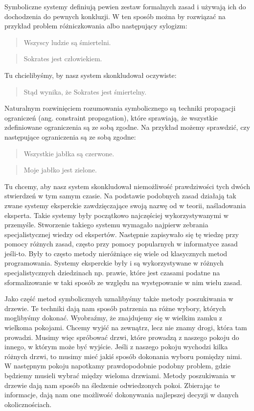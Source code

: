 \noindent Symboliczne systemy definiują pewien zestaw formalnych zasad i używają ich do dochodzenia do pewnych konkluzji. W ten sposób można by rozwiązać na przykład problem różniczkowania albo następujący sylogizm:

\begin{quote}
Wszyscy ludzie są śmiertelni.
\end{quote}
\begin{quote}
Sokrates jest człowiekiem.
\end{quote}

\noindent Tu chcielibyśmy, by nasz system skonkludował oczywiste:

\begin{quote}
Stąd wynika, że Sokrates jest śmiertelny.
\end{quote}

\noindent Naturalnym rozwinięciem rozumowania symbolicznego są techniki propagacji ograniczeń (ang. constraint propagation), które sprawiają, że wszystkie zdefiniowane ograniczenia są ze sobą zgodne. Na przykład możemy sprawdzić, czy następujące ograniczenia są ze sobą zgodne:

\begin{quote}
Wszystkie jabłka są czerwone.
\end{quote}
\begin{quote}
Moje jabłko jest zielone.
\end{quote}

Tu chcemy, aby nasz system skonkludował niemożliwość prawdziwości tych dwóch stwierdzeń w tym samym czasie. Na podstawie podobnych zasad działają tak zwane systemy eksperckie zawdzięczające swoją nazwę od w teorii, naśladowania eksperta. Takie systemy były początkowo najczęściej wykorzystywanymi w przemyśle. Stworzenie takiego systemu wymagało najpierw zebrania specjalistycznej wiedzy od ekspertów. Następnie zapisywało się tę wiedzę przy pomocy różnych zasad, często przy pomocy popularnych w informatyce zasad jeśli-to. Były to często metody nieróżniące się wiele od klasycznych metod programowania. Systemy eksperckie były i są wykorzystywane w różnych specjalistycznych dziedzinach np. prawie, które jest czasami podatne na sformalizowanie w taki sposób ze względu na występowanie w nim wielu zasad.\newline

Jako część metod symbolicznych uznalibyśmy także metody poszukiwania w drzewie. Te techniki dają nam sposób patrzenia na różne wybory, których moglibyśmy dokonać. Wyobraźmy, że znajdujemy się w wielkim zamku z wielkoma pokojami. Chcemy wyjść na zewnątrz, lecz nie znamy drogi, która tam prowadzi. Musimy więc spróbować drzwi, które prowadzą z naszego pokoju do innego, w którym może być wyjście. Jeśli z naszego pokoju wychodzi kilka różnych drzwi, to musimy mieć jakiś sposób dokonania wyboru pomiędzy nimi. W następnym pokoju napotkamy prawdopodobnie podobny problem, gdzie będziemy musieli wybrać między wieloma drzwiami. Metody poszukiwania w drzewie dają nam sposób na śledzenie odwiedzonych pokoi. Zbierając te informacje, dają nam one możliwość dokonywania najlepszej decyzji w danych okolicznościach.

